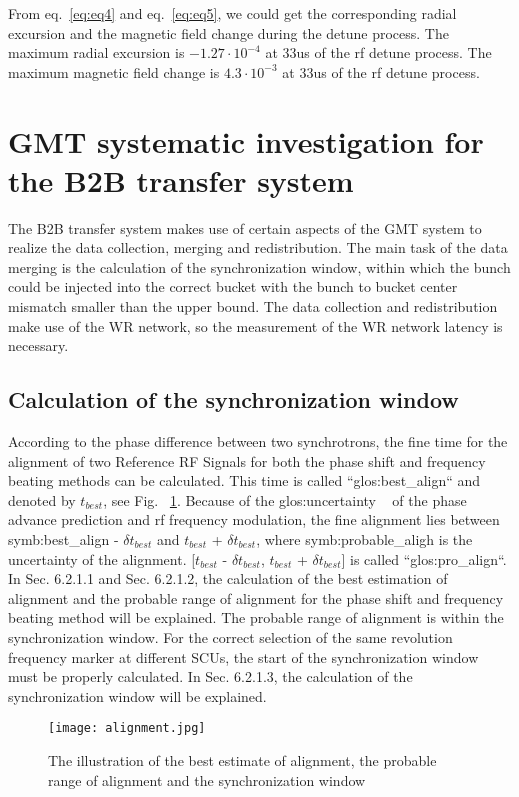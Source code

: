 
From eq.~\ref{eq:eq4} and eq.~\ref{eq:eq5}, we could get the corresponding radial excursion and the magnetic field change during the detune process. The maximum radial excursion is $-1.27 \cdot 10^{-4}$ at 33us of the rf detune process. The maximum magnetic field change is $4.3 \cdot 10^{-3}$ at 33us of the rf detune process.
 
\section{GMT systematic investigation for the B2B transfer system}
The B2B transfer system makes use of certain aspects of the GMT system to realize the data collection, merging and redistribution. The main task of the data merging is the calculation of the synchronization window, within which the bunch could be injected into the correct bucket with the bunch to bucket center mismatch smaller than the upper bound. The data collection and redistribution make use of the WR network, so the measurement of the WR network latency is necessary. 

\subsection{Calculation of the synchronization window}
According to the phase difference between two synchrotrons, the fine time for the alignment of two Reference RF Signals for both the phase shift and frequency beating methods can be calculated. This time is called ``\gls{glos:best_align}`` and denoted by $t_{best}$, see Fig. ~\ref{alignment}. Because of the \gls{glos:uncertainty} ~\cite{taylor_introduction_1982} of the phase advance prediction and rf frequency modulation, the fine alignment lies between \gls{symb:best_align} - $\delta t_{best}$ and $t_{best}$ + $\delta t_{best}$, where \gls{symb:probable_aligh} is the uncertainty of the alignment. [$t_{best}$ - $\delta t_{best}$, $t_{best}$ + $\delta t_{best}$] is called ``\gls{glos:pro_align}``. In Sec. 6.2.1.1 and Sec. 6.2.1.2, the calculation of the best estimation of alignment and the probable range of alignment for the phase shift and frequency beating method will be explained. The probable range of alignment is within the synchronization window. For the correct selection of the same revolution frequency marker at different SCUs, the start of the synchronization  window must be properly calculated. In Sec. 6.2.1.3, the calculation of the synchronization window will be explained. 
\begin{figure}[!htb]
   \centering   
   \texttt{[image: alignment.jpg]}
   \caption{The illustration of the best estimate of alignment, the probable range of alignment and the synchronization window}
   \label{alignment}
\end{figure}

